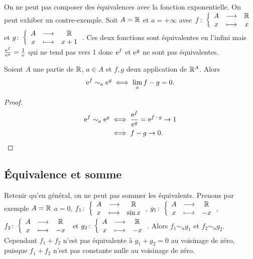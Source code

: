 On ne peut pas composer des équivalences avec la fonction exponentielle. On peut 
exhiber un contre-exemple. Soit \(A=\R\) et \(a=+\infty\) avec 
\(\fonction{f}{A}{\R}{x}{x}\) et \(\fonction{g}{A}{\R}{x}{x+1}\). Ces deux 
fonctions sont équivalentes en l'infini mais \(\frac{\e^{f}}{\e^{g}} 
=\frac{1}{e}\) qui ne tend pas vers 1 donc \(\e^{f}\) et \(\e^{g}\) ne sont pas 
équivalentes.

\begin{theo}
  Soient \(A\) une partie de \(\R\), \(a \in A\) et \(f, g\) deux application de 
  \(\R^A\). Alors
  \begin{equation}
    \e^{f} \sim_a \e^{g} \iff \lim\limits_{a}f-g=0.
  \end{equation}
\end{theo}
\begin{proof}
  \begin{align}
    \e^{f} \sim_a \e^{g} &\iff \frac{\e^f}{\e^g} = \e^{f-g} \to 1 \\
    &\iff f-g \to 0.
  \end{align}
\end{proof}

\subsection{Équivalence et somme}

Retenir qu'en général, on ne peut pas sommer les équivalents. Prenons par 
exemple \(A=\R\) \(a=0\), \(\fonction{f_1}{A}{\R}{x}{\sin x}\), 
\(\fonction{g_1}{A}{\R}{x}{-x}\), \(\fonction{f_2}{A}{\R}{x}{-x}\) et 
\(\fonction{g_2}{A}{\R}{x}{-x}\). Alors \(f_1 \sim_a g_1\) et \(f_2 \sim_a 
g_2\). Cependant \(f_1+f_2\) n'est pas équivalente à \(g_1+g_2=0\) au voisinage 
de zéro, puisque \(f_1+f_2\) n'est pas constante nulle au voisinage de zéro.

